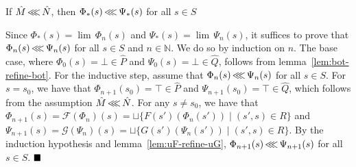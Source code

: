 
\begin{lemma} \label{lem:Phi-refine-Psi}
If $\hat M \operatorname{\lll} \hat N$, then $\Phi_{*}(s) \operatorname{\lll} \Psi_{*}(s)$ for all $s \in S$
\end{lemma}

Since $\Phi_{*}(s) = \lim \, \Phi_{n}(s)$ and $\Psi_{*}(s) = \lim \, \Psi_{n}(s)$, it suffices to prove that $\Phi_{n}(s) \operatorname{\lll} \Psi_{n}(s)$ for all $s \in S$ and $n \in \mathbb{N}$. We do so by induction on $n$. The base case, where $\Phi_{0}(s) = \bot \in \hat P$ and $\Psi_{0}(s) = \bot \in \hat Q$, follows from lemma~\ref{lem:bot-refine-bot}. For the inductive step, assume that $\Phi_{n}(s) \operatorname{\lll} \Psi_{n}(s)$ for all $s \in S$. For $s = s_{0}$, we have that $\Phi_{n+1}(s_{0}) = \top \in \hat P$ and $\Psi_{n+1}(s_{0}) = \top \in \hat Q$, which follows from the assumption $\hat M \operatorname{\lll} \hat N$. For any $s \neq s_{0}$, we have that $\Phi_{n+1}(s) = \mathcal{F}(\Phi_{n})(s) = \sqcup \{ F(s')(\Phi_{n}(s')) \mid (s',s) \in R \}$ and $\Psi_{n+1}(s) = \mathcal{G}(\Psi_{n})(s) = \sqcup \{ G(s')(\Psi_{n}(s')) \mid (s',s) \in R \}$. By the induction hypothesis and lemma~\ref{lem:uF-refine-uG}, $\Phi_{n+1}(s) \operatorname{\lll} \Psi_{n+1}(s)$ for all $s \in S$. $\qedb$






